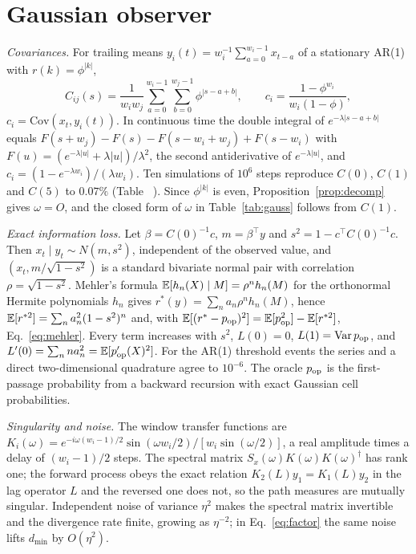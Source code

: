 \appendix

\section{Gaussian observer}\label{app:gauss}

\emph{Covariances.} For trailing means $y_i(t)=w_i^{-1}\sum_{a=0}^{w_i-1}x_{t-a}$ of a stationary AR(1) with $r(k)=\phi^{|k|}$,
\begin{equation}
C_{ij}(s)=\frac{1}{w_iw_j}\sum_{a=0}^{w_i-1}\sum_{b=0}^{w_j-1}\phi^{|s-a+b|},\qquad c_i=\frac{1-\phi^{w_i}}{w_i(1-\phi)},
\end{equation}
$c_i=\mathrm{Cov}(x_t,y_i(t))$. In continuous time the double integral of $e^{-\lambda|s-a+b|}$ equals $F(s+w_j)-F(s)-F(s-w_i+w_j)+F(s-w_i)$ with $F(u)=(e^{-\lambda|u|}+\lambda|u|)/\lambda^2$, the second antiderivative of $e^{-\lambda|u|}$, and $c_i=(1-e^{-\lambda w_i})/(\lambda w_i)$. Ten simulations of $10^6$ steps reproduce $C(0)$, $C(1)$ and $C(5)$ to $0.07\%$ (Table~ \cite{SM}). Since $\phi^{|k|}$ is even, Proposition~\ref{prop:decomp} gives $\omega=O$, and the closed form of $\omega$ in Table~\ref{tab:gauss} follows from $C(1)$.

\emph{Exact information loss.} Let $\beta=C(0)^{-1}c$, $m=\beta^\top y$ and $s^2=1-c^\top C(0)^{-1}c$. Then $x_t\mid y_t\sim N(m,s^2)$, independent of the observed value, and $(x_t,m/\sqrt{1-s^2})$ is a standard bivariate normal pair with correlation $\rho=\sqrt{1-s^2}$. Mehler's formula $\mathbb{E}[h_n(X)\mid M]=\rho^nh_n(M)$ for the orthonormal Hermite polynomials $h_n$ \cite{mehler1866,odonnell2014} gives $r^*(y)=\sum_na_n\rho^nh_n(M)$, hence $\mathbb{E}[r^{*2}]=\sum_na_n^2(1-s^2)^n$ and, with $\mathbb{E}[(r^*-p_{\mathrm{op}})^2]=\mathbb{E}[p_{\mathrm{op}}^2]-\mathbb{E}[r^{*2}]$, Eq.~\eqref{eq:mehler}. Every term increases with $s^2$, $L(0)=0$, $L(1)=\mathrm{Var}\,p_{\mathrm{op}}$, and $L'(0)=\sum_n na_n^2=\mathbb{E}[p_{\mathrm{op}}'(X)^2]$. For the AR(1) threshold events the series and a direct two-dimensional quadrature agree to $10^{-6}$. The oracle $p_{\mathrm{op}}$ is the first-passage probability from a backward recursion with exact Gaussian cell probabilities.

\emph{Singularity and noise.} The window transfer functions are $K_i(\omega)=e^{-i\omega(w_i-1)/2}\sin(\omega w_i/2)/[w_i\sin(\omega/2)]$, a real amplitude times a delay of $(w_i-1)/2$ steps. The spectral matrix $S_x(\omega)K(\omega)K(\omega)^\dagger$ has rank one; the forward process obeys the exact relation $K_2(L)y_1=K_1(L)y_2$ in the lag operator $L$ and the reversed one does not, so the path measures are mutually singular. Independent noise of variance $\eta^2$ makes the spectral matrix invertible and the divergence rate finite, growing as $\eta^{-2}$; in Eq.~\eqref{eq:factor} the same noise lifts $d_{\min}$ by $O(\eta^2)$.

